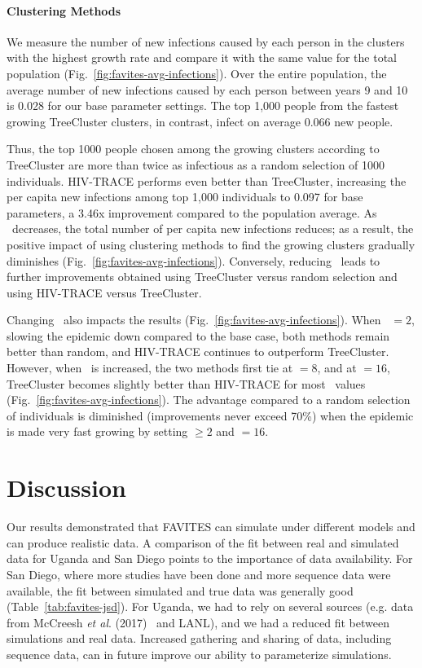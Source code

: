 \paragraph{Clustering Methods} We measure the number of new infections caused by each person in the clusters with the highest growth rate and compare it with the same value for the total population (Fig.~\ref{fig:favites-avg-infections}). Over the entire population, the average number of new infections caused by each person between years 9 and 10 is 0.028 for our base parameter settings. The top 1,000 people from the fastest growing TreeCluster clusters, in contrast, infect on average 0.066 new people.

Thus, the top 1000 people chosen among the growing clusters according to TreeCluster are more than twice as infectious as a random selection of 1000 individuals. HIV-TRACE performs even better than TreeCluster, increasing the per capita new infections among top 1,000 individuals to 0.097 for base parameters, a 3.46x improvement compared to the population average. As \EART\ decreases, the total number of per capita new infections reduces; as a result, the positive impact of using clustering methods to find the growing clusters gradually diminishes (Fig.~\ref{fig:favites-avg-infections}). Conversely, reducing \EART\ leads to further improvements obtained using TreeCluster versus random selection and using HIV-TRACE versus TreeCluster.

Changing \ED\ also impacts the results (Fig.~\ref{fig:favites-avg-infections}). When \ED\ $=2$, slowing the epidemic down compared to the base case, both methods remain better than random, and HIV-TRACE continues to outperform TreeCluster. However, when \ED\ is increased, the two methods first tie at \ED$=8$, and at \ED$=16$, TreeCluster becomes slightly better than HIV-TRACE for most \EART\ values (Fig.~\ref{fig:favites-avg-infections}). The advantage compared to a random selection of individuals is diminished (improvements never exceed 70\%) when the epidemic is made very fast growing by setting \EART$\geq 2$ and \ED$=16$.

\section{Discussion}
Our results demonstrated that FAVITES can simulate under different models and can produce realistic data. A comparison of the fit between real and simulated data for Uganda and San Diego points to the importance of data availability. For San Diego, where more studies have been done and more sequence data were available, the fit between simulated and true data was generally good (Table~\ref{tab:favites-jsd}). For Uganda, we had to rely on several sources (e.g. data from McCreesh \textit{et al}. (2017)~\cite{McCreesh2017} and \gls{LANL}), and we had a reduced fit between simulations and real data. Increased gathering and sharing of data, including sequence data, can in future improve our ability to parameterize simulations.

